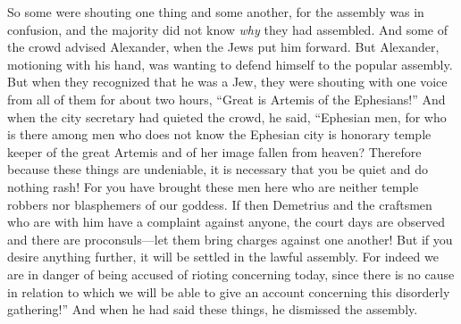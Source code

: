 \begin{biblechapter}
\verse So some were shouting one thing and some another, for the assembly was in confusion, and the majority did not know \textit{why} they had assembled.
\verse And some of the crowd advised Alexander, when the Jews put him forward. But Alexander, motioning with his hand, was wanting to defend himself to the popular assembly.
\verse But when they recognized that he was a Jew, they were shouting with one voice from all of them for about two hours, “Great is Artemis of the Ephesians!”
\verse And when the city secretary had quieted the crowd, he said, “Ephesian men, for who is there among men who does not know the Ephesian city is honorary temple keeper of the great Artemis and of her image fallen from heaven?
\verse Therefore because these things are undeniable, it is necessary that you be quiet and do nothing rash!
\verse For you have brought these men here who are neither temple robbers nor blasphemers of our goddess.
\verse If then Demetrius and the craftsmen who are with him have a complaint against anyone, the court days are observed and there are proconsuls—let them bring charges against one another!
\verse But if you desire anything further, it will be settled in the lawful assembly.
\verse For indeed we are in danger of being accused of rioting concerning today, since there is no cause in relation to which we will be able to give an account concerning this disorderly gathering!” And when he had said these things, he dismissed the assembly.
\end{biblechapter}

